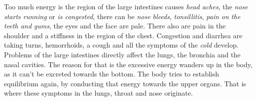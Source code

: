 \documentclass[../Book.Stress_regulation.tex]{subfiles}
\begin{document}
Too much energy is the region of the large intestines causes \emph{head aches}, the \emph{nose starts running} or \emph{is congested}, there can be \emph{nose bleeds}, \emph{tonsillitis}, \emph{pain on the teeth and gums}, the eyes and the face are pale.
There also are pain in the shoulder and a stiffness in the region of the chest.
Congestion and diarrhea are taking turns, hemorrhoids, a cough and all the symptoms of the \emph{cold} develop.
Problems of the large intestines directly affect the lungs, the bronchia and the nasal cavities.
The reason for that is the excessive energy wanders up in the body, as it can't be excreted towards the bottom.
The body tries to establish equilibrium again, by conducting that energy towards the upper organs. That is where these symptoms in the lungs, throat and nose originate.
\end{document}
